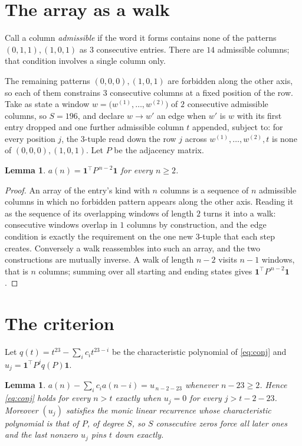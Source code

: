 \documentclass[11pt,a4paper]{article}
\theoremstyle{plain}
\newtheorem{lemma}[theorem]{Lemma}
\theoremstyle{definition}
\begin{document}
\section{The array as a walk}

Call a column \emph{admissible} if the word it forms contains none of the patterns
$(0,1,1), (1,0,1)$ as $3$ consecutive entries. There are $14$ admissible columns; that condition
involves a single column only.

The remaining patterns $(0,0,0), (1,0,1)$ are forbidden along the other axis, so each of them
constrains $3$ consecutive columns at a fixed position of the row. Take as state a
window $w=\bigl(w^{(1)},\dots,w^{(2)}\bigr)$ of $2$ consecutive admissible
columns, so $S=196$, and declare $w\to w'$ an edge when $w'$ is $w$ with its first entry
dropped and one further admissible column $t$ appended, subject to: for every position
$j$, the $3$-tuple read down the row $j$ across $w^{(1)},\dots,w^{(2)},t$
is none of $(0,0,0), (1,0,1)$. Let $P$ be the adjacency matrix.

\begin{lemma}\label{lem:walk}
$a(n)=\mathbf{1}^{\!\top}P^{\,n-2}\mathbf{1}$ for every $n\ge2$.
\end{lemma}

\begin{proof}
An array of the entry's kind with $n$ columns is a sequence of $n$ admissible columns in
which no forbidden pattern appears along the other axis. Reading it as the sequence of its
overlapping windows of length $2$ turns it into a walk: consecutive windows overlap in
$1$ columns by construction, and the edge condition is exactly the requirement on the one
new $3$-tuple that each step creates. Conversely a walk reassembles into such an array,
and the two constructions are mutually inverse. A walk of length $n-2$ visits $n-1$
windows, that is $n$ columns; summing over all starting and ending states gives
$\mathbf{1}^{\!\top}P^{\,n-2}\mathbf{1}$.
\end{proof}

\section{The criterion}

Let $q(t)=t^{23}-\sum_i c_i t^{23-i}$ be the characteristic polynomial of
\eqref{eq:conj} and $u_j=\mathbf{1}^{\!\top}P^{j}q(P)\mathbf{1}$.

\begin{lemma}\label{lem:crit}
$a(n)-\sum_i c_i a(n-i)=u_{\,n-2-23}$ whenever $n-23\ge2$. Hence
\eqref{eq:conj} holds for every $n>t$ exactly when $u_j=0$ for every
$j>t-2-23$. Moreover $(u_j)$ satisfies the monic linear recurrence whose
characteristic polynomial is that of $P$, of degree $S$, so $S$ consecutive zeros force all
later ones and the last nonzero $u_j$ pins $t$ down exactly.
\end{lemma}
\end{document}
